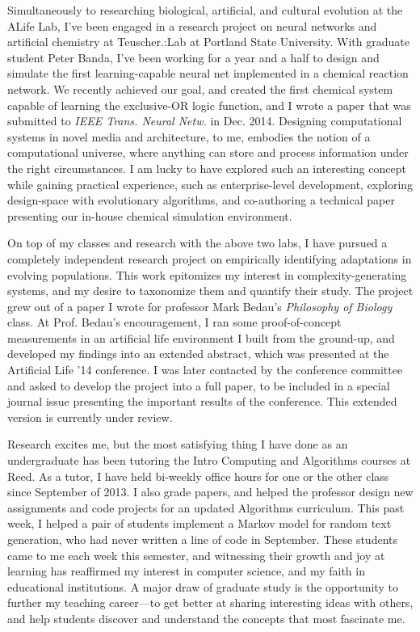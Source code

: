 \documentclass{article}
\begin{document}
Simultaneously to researching biological, artificial, and cultural evolution at the ALife Lab, I've been engaged in a research project on neural networks and artificial chemistry at Teuscher.:Lab at Portland State University. With graduate student Peter Banda, I've been working for a year and a half to design and simulate the first learning-capable neural net implemented in a chemical reaction network. We recently achieved our goal, and created the first chemical system capable of learning the exclusive-OR logic function, and I wrote a paper that was submitted to \emph{IEEE Trans. Neural Netw.} in Dec. 2014. Designing computational systems in novel media and architecture, to me, embodies the notion of a computational universe, where anything can store and process information under the right circumstances. I am lucky to have explored such an interesting concept while gaining practical experience, such as enterprise-level development, exploring design-space with evolutionary algorithms, and co-authoring a technical paper presenting our in-house chemical simulation environment.


On top of my classes and research with the above two labs, I have pursued a completely independent research project on empirically identifying adaptations in evolving populations. This work epitomizes my interest in complexity-generating systems, and my desire to taxonomize them and quantify their study. The project grew out of a paper I wrote for professor Mark Bedau's \emph{Philosophy of Biology} class. At Prof. Bedau's encouragement, I ran some proof-of-concept measurements in an artificial life environment I built from the ground-up, and developed my findings into an extended abstract, which was presented at the Artificial Life '14 conference. I was later contacted by the conference committee and asked to develop the project into a full paper, to be included in a special journal issue presenting the important results of the conference. This extended version is currently under review.

Research excites me, but the most satisfying thing I have done as an undergraduate has been tutoring the Intro Computing and Algorithms courses at Reed. As a tutor, I have held bi-weekly office hours for one or the other class since September of 2013. I also grade papers, and helped the professor design new assignments and code projects for an updated Algorithms curriculum. This past week, I helped a pair of students implement a Markov model for random text generation, who had never written a line of code in September. These students came to me each week this semester, and witnessing their growth and joy at learning has reaffirmed my interest in computer science, and my faith in educational institutions. A major draw of graduate study is the opportunity to further my teaching career---to get better at sharing interesting ideas with others, and help students discover and understand the concepts that most fascinate me.
\end{document}
